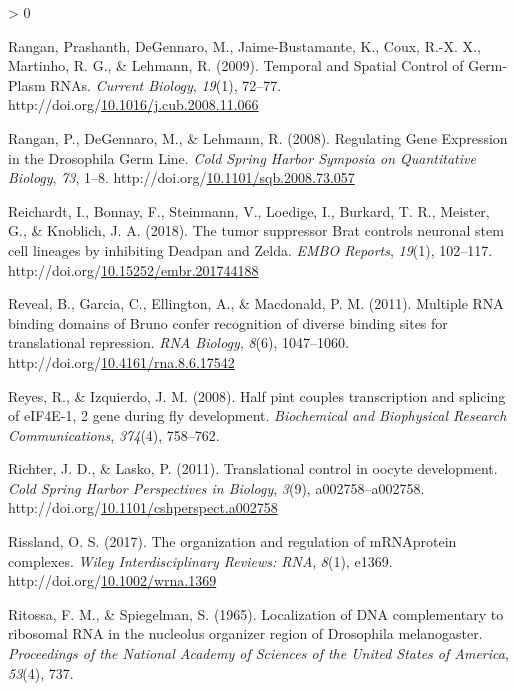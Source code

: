 \documentclass[12pt,oneside]{reedthesis}
\newlength{\cslhangindent}
\newenvironment{CSLReferences}[2] %
 {%
  \setlength{\parindent}{0pt}
  \ifodd #1 \everypar{\setlength{\hangindent}{\cslhangindent}}\ignorespaces\fi
  \ifnum #2 > 0
  \setlength{\parskip}{#2\baselineskip}
  \fi
 }%
 {}
\begin{document}
\begin{CSLReferences}{1}{0}
\leavevmode\hypertarget{ref-Rangan2009}{}%
Rangan, Prashanth, DeGennaro, M., Jaime-Bustamante, K., Coux, R.-X. X., Martinho, R. G., \& Lehmann, R. (2009). Temporal and {Spatial Control} of {Germ}-{Plasm RNAs}. \emph{Current Biology}, \emph{19}(1), 72--77. http://doi.org/\href{https://doi.org/10.1016/j.cub.2008.11.066}{10.1016/j.cub.2008.11.066}

\leavevmode\hypertarget{ref-Rangan2008}{}%
Rangan, P., DeGennaro, M., \& Lehmann, R. (2008). Regulating {Gene Expression} in the {Drosophila Germ Line}. \emph{Cold Spring Harbor Symposia on Quantitative Biology}, \emph{73}, 1--8. http://doi.org/\href{https://doi.org/10.1101/sqb.2008.73.057}{10.1101/sqb.2008.73.057}

\leavevmode\hypertarget{ref-Reichardt2018d}{}%
Reichardt, I., Bonnay, F., Steinmann, V., Loedige, I., Burkard, T. R., Meister, G., \& Knoblich, J. A. (2018). The tumor suppressor {Brat} controls neuronal stem cell lineages by inhibiting {Deadpan} and {Zelda}. \emph{EMBO Reports}, \emph{19}(1), 102--117. http://doi.org/\href{https://doi.org/10.15252/embr.201744188}{10.15252/embr.201744188}

\leavevmode\hypertarget{ref-Reveal2011j}{}%
Reveal, B., Garcia, C., Ellington, A., \& Macdonald, P. M. (2011). Multiple {RNA} binding domains of {Bruno} confer recognition of diverse binding sites for translational repression. \emph{RNA Biology}, \emph{8}(6), 1047--1060. http://doi.org/\href{https://doi.org/10.4161/rna.8.6.17542}{10.4161/rna.8.6.17542}

\leavevmode\hypertarget{ref-Reyes2008}{}%
Reyes, R., \& Izquierdo, J. M. (2008). Half pint couples transcription and splicing of {eIF4E}-1, 2 gene during fly development. \emph{Biochemical and Biophysical Research Communications}, \emph{374}(4), 758--762.

\leavevmode\hypertarget{ref-Richter2011j}{}%
Richter, J. D., \& Lasko, P. (2011). Translational control in oocyte development. \emph{Cold Spring Harbor Perspectives in Biology}, \emph{3}(9), a002758--a002758. http://doi.org/\href{https://doi.org/10.1101/cshperspect.a002758}{10.1101/cshperspect.a002758}

\leavevmode\hypertarget{ref-Rissland2017k}{}%
Rissland, O. S. (2017). The organization and regulation of {mRNA}{}protein complexes. \emph{Wiley Interdisciplinary Reviews: RNA}, \emph{8}(1), e1369. http://doi.org/\href{https://doi.org/10.1002/wrna.1369}{10.1002/wrna.1369}

\leavevmode\hypertarget{ref-Ritossa1965a}{}%
Ritossa, F. M., \& Spiegelman, S. (1965). Localization of {DNA} complementary to ribosomal {RNA} in the nucleolus organizer region of {Drosophila} melanogaster. \emph{Proceedings of the National Academy of Sciences of the United States of America}, \emph{53}(4), 737.


\end{CSLReferences}
\end{document}
